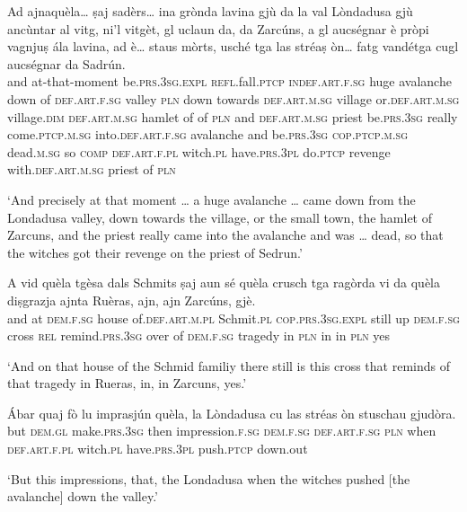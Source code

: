 \begin{linenumbers}
\gll    Ad ajnaquèla… ṣaj sadèrs… ina grònda lavina gjù da la val Lòndadusa gjù ancùntar al vitg, ni’l vitgèt, gl uclaun da, da Zarcúns, a gl aucségnar è pròpi vagnjuṣ ála lavina, ad è… staus mòrts, usché tga las stréaṣ òn… fatg vandétga cugl aucségnar da Sadrún.\\
and at-that-moment be.\textsc{prs.3sg.expl} \textsc{refl.}fall.\textsc{ptcp} \textsc{indef.art.f.sg} huge avalanche down of  \textsc{def.art.f.sg} valley \textsc{pln} down towards \textsc{def.art.m.sg} village or.\textsc{def.art.m.sg} village.\textsc{dim} \textsc{def.art.m.sg} hamlet of of \textsc{pln} and \textsc{def.art.m.sg} priest be.\textsc{prs.3sg} really come.\textsc{ptcp.m.sg} into.\textsc{def.art.f.sg} avalanche and be.\textsc{prs.3sg} \textsc{cop.ptcp.m.sg} dead.\textsc{m.sg} so \textsc{comp} \textsc{def.art.f.pl} witch.\textsc{pl} have.\textsc{prs.3pl} do.\textsc{ptcp} revenge with.\textsc{def.art.m.sg} priest of \textsc{pln}\\
\end{linenumbers}
\medskip
\glt `And precisely at that moment … a huge avalanche … came down from the Londadusa valley, down towards the village, or the small town, the hamlet of Zarcuns, and the priest really came into the avalanche and was … dead, so that the witches got their revenge on the priest of Sedrun.'
\medskip

\begin{linenumbers}
\gll    A vid quèla tgèsa dals Schmits ṣaj aun sé quèla crusch tga ragòrda vi da quèla diṣgrazja ajnta Ruèras, ajn, ajn Zarcúns, gjè.\\
and at \textsc{dem.f.sg} house of.\textsc{def.art.m.pl} Schmit.\textsc{pl} \textsc{cop.prs.3sg.expl} still up \textsc{dem.f.sg} cross \textsc{rel} remind.\textsc{prs.3sg} over of \textsc{dem.f.sg} tragedy in \textsc{pln} in in \textsc{pln} yes\\
\end{linenumbers}
\medskip
\glt `And on that house of the Schmid familiy there still is this cross that reminds of that tragedy in Rueras, in, in Zarcuns, yes.'
\medskip

\begin{linenumbers}
\gll    Ábar quaj fò lu imprasjún quèla, la Lòndadusa cu las stréas òn stuschau gjudòra.\\
but \textsc{dem.gl} make.\textsc{prs.3sg} then impression.\textsc{f.sg} \textsc{dem.f.sg} \textsc{def.art.f.sg} \textsc{pln} when \textsc{def.art.f.pl} witch.\textsc{pl}  have.\textsc{prs.3pl} push.\textsc{ptcp} down.out \\
\end{linenumbers}
\medskip
\glt `But this impressions, that, the Londadusa when the witches pushed [the avalanche] down the valley.'
\medskip

